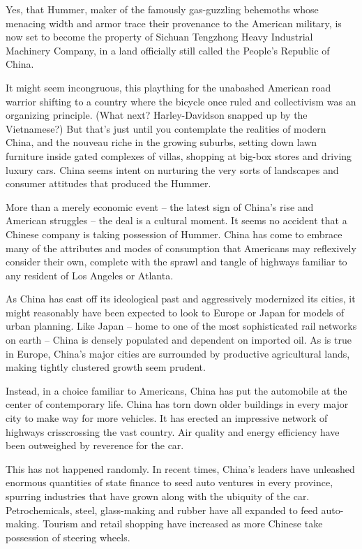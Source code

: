 \documentclass[12pt,a4paper,onecolumn]{article}
\begin{document}
Yes, that Hummer, maker of the famously gas-guzzling behemoths whose menacing width and armor trace
their provenance to the American military, is now set to become the property of Sichuan Tengzhong
Heavy Industrial Machinery Company, in a land officially still called the People's Republic of
China.

It might seem incongruous, this plaything for the unabashed American road warrior shifting to a
country where the bicycle once ruled and collectivism was an organizing principle. (What next?
Harley-Davidson snapped up by the Vietnamese?) But that's just until you contemplate the realities
of modern China, and the nouveau riche in the growing suburbs, setting down lawn furniture inside
gated complexes of villas, shopping at big-box stores and driving luxury cars. China seems intent on
nurturing the very sorts of landscapes and consumer attitudes that produced the Hummer.

More than a merely economic event -- the latest sign of China's rise and American struggles -- the
deal is a cultural moment. It seems no accident that a Chinese company is taking possession of
Hummer. China has come to embrace many of the attributes and modes of consumption that Americans may
reflexively consider their own, complete with the sprawl and tangle of highways familiar to any
resident of Los Angeles or Atlanta.

As China has cast off its ideological past and aggressively modernized its cities, it might
reasonably have been expected to look to Europe or Japan for models of urban planning. Like Japan --
home to one of the most sophisticated rail networks on earth -- China is densely populated and
dependent on imported oil. As is true in Europe, China's major cities are surrounded by productive
agricultural lands, making tightly clustered growth seem prudent.

Instead, in a choice familiar to Americans, China has put the automobile at the center of
contemporary life. China has torn down older buildings in every major city to make way for more
vehicles. It has erected an impressive network of highways crisscrossing the vast country. Air
quality and energy efficiency have been outweighed by reverence for the car.

This has not happened randomly. In recent times, China's leaders have unleashed enormous quantities
of state finance to seed auto ventures in every province, spurring industries that have grown along
with the ubiquity of the car. Petrochemicals, steel, glass-making and rubber have all expanded to
feed auto-making. Tourism and retail shopping have increased as more Chinese take possession of
steering wheels.
\end{document}
